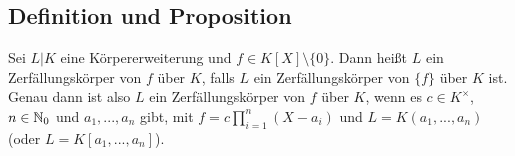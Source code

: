 \subsection{Definition und Proposition} Sei $L|K$ eine Körpererweiterung und $f \in K[X] \setminus \{0\}$. Dann heißt $L$ ein Zerfällungskörper von $f$ über $K$, falls $L$ ein Zerfällungskörper von $\{f\}$ über $K$ ist. Genau dann ist also $L$ ein Zerfällungskörper von $f$ über $K$, wenn es $c \in K^\times$, $n \in \mathbb N_0$ und $a_1,...,a_n$ gibt, mit $f = c \prod_{i=1}^n (X-a_i)$ und $L = K(a_1,...,a_n)$ (oder $L=K[a_1,...,a_n]$).